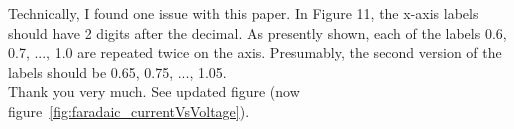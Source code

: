 \documentclass[journal, a4paper]{IEEEtran}
\begin{document}
{Technically, I found one issue with this paper. In Figure 11, the x-axis labels should have 2 digits after the decimal. As presently shown, each of the labels 0.6, 0.7, ..., 1.0 are repeated twice on the axis. Presumably, the second version of the labels should be 0.65, 0.75, ..., 1.05.\\
{\color{OliveGreen}Thank you very much. See updated figure (now figure~\ref{fig:faradaic_currentVsVoltage}).}\\

}
\end{document}
